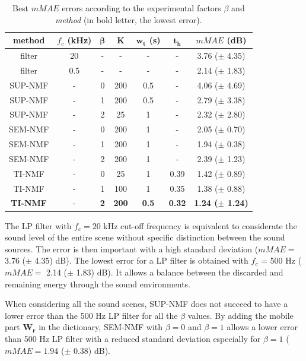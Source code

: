 \documentclass[review,5p,twocolumn,sort&compress,times]{elsarticle}
\begin{document}
\begin{table}[t]
\centering
\caption{Best $mMAE$ errors according to the experimental factors $\beta$ and \textit{method} (in bold letter, the lowest error).}
\begin{tabular}{@{}ccccccc@{}}
\toprule
\textbf{method} & $f_c$ (kHz) & $\mathbf{\beta}$ & $\mathbf{K}$ & $\mathbf{w_t}$ (s) &  $\mathbf{t_h}$ &  \textbf{$mMAE$} (dB) \\ \midrule
filter & 20 & - & - & - & - & 3.76 ($\pm$ 4.35) \\
filter & 0.5 & - & - & - & - & 2.14 ($\pm$ 1.83) \\
\hline \hline
SUP-NMF & - & 0 & 200 & 0.5 & - & 4.06 ($\pm$ 4.69) \\
SUP-NMF & - & 1 & 200 & 0.5 & - & 2.79 ($\pm$ 3.38) \\
SUP-NMF & - & 2 & 25 & 1 & - & 2.32  ($\pm$ 2.80) \\
\hline \hline
SEM-NMF & - & 0 & 200 & 1 & - & 2.05 ($\pm$ 0.70) \\
SEM-NMF & - & 1 & 200 & 1 & - & 1.94 ($\pm$ 0.38) \\
SEM-NMF & - & 2 & 200 & 1 & - & 2.39 ($\pm$ 1.23) \\
\hline \hline
TI-NMF & - & 0 & 25 & 1 & 0.39 & 1.42 ($\pm$ 0.89)\\
TI-NMF & - & 1 & 100 & 1 & 0.35 & 1.38 ($\pm$ 0.88)\\
\textbf{TI-NMF }& - & \textbf{2} & \textbf{200} & \textbf{0.5} & \textbf{0.32} & \textbf{1.24 ($\pm$ 1.24)}\\
\bottomrule
\end{tabular}
\label{tab:results}
\end{table}

The LP filter with $f_c = 20$ kHz cut-off frequency is equivalent to considerate the sound level of the entire scene without specific distinction between the sound sources. The error is then important with a high standard deviation ($mMAE =$ 3.76 ($\pm$ 4.35) dB). The lowest error for a LP filter is obtained with $f_c$ = 500 Hz ($mMAE =$ 2.14 ($\pm$ 1.83) dB). It allows a balance between the discarded and remaining energy through the sound environments.

When considering all the sound scenes, SUP-NMF does not succeed to have a lower error than the 500 Hz LP filter for all the $\beta$ values. By adding the mobile part $\mathbf{W_r}$ in the dictionary, SEM-NMF with $\beta = 0$ and $\beta = 1$ allows a lower error than 500 Hz LP filter with a reduced standard deviation especially for $\beta = 1$ ($mMAE = 1.94$ ($\pm$ 0.38) dB).
\end{document}
